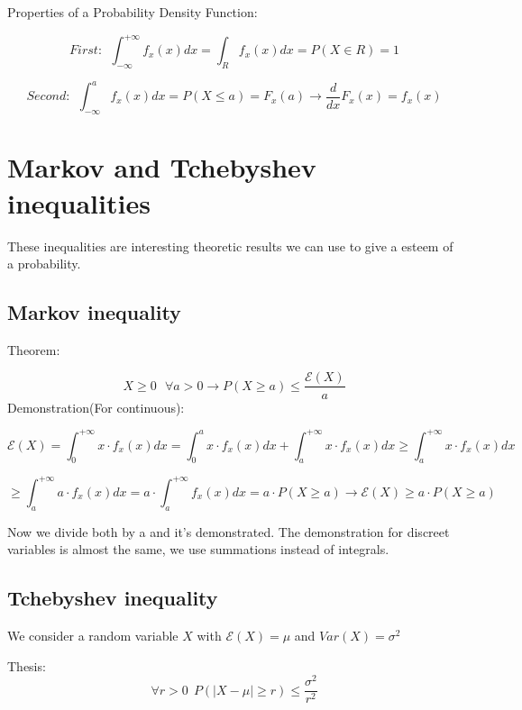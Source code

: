 \documentclass{article}
\begin{document}
\bigskip

\bigskip

\bigskip

\bigskip

\bigskip

Properties of a Probability Density Function:

$$First: \ \ \int_{- \infty}^{+ \infty} f_x(x)dx = \int_{R} f_x(x)dx = P(X \in R) = 1$$

$$Second: \ \ \int_{- \infty}^{a} f_x(x)dx = P(X \leq a) = F_x(a) \longrightarrow \frac{d}{dx} F_x(x) = f_x(x)$$

\section{Markov and Tchebyshev inequalities}

These inequalities are interesting theoretic results we can use to give a esteem of a probability.
\bigskip

\subsection{Markov inequality}

Theorem:
\bigskip

$$X \geq 0 \ \ \  \forall a > 0 \rightarrow P(X \geq a) \leq \frac{\mathcal E(X)}{a}$$
\bigskip
Demonstration(For continuous):

$$\mathcal E(X) = \int_{0}^{+ \infty} x \cdot f_x(x)dx = \int_{0}^ax\cdot f_x(x)dx + \int_{a}^{+ \infty} x \cdot f_x(x)dx \geq \int_{a}^{+ \infty} x \cdot f_x(x)dx$$

\bigskip 

$$\geq \int_{a}^{+ \infty} a \cdot f_x(x)dx = a \cdot \int_{a}^{+ \infty} f_x(x)dx = a \cdot P(X \geq a) \longrightarrow \mathcal E(X) \geq a \cdot P(X \geq a)$$

Now we divide both by a and it's demonstrated. The demonstration for discreet variables is almost the same, we use summations instead of integrals.

\subsection{Tchebyshev inequality}

We consider a random variable $X$ with $\mathcal E(X) = \mu$ and $Var(X) = \sigma^2$

Thesis:
$$\forall r > 0 \ \ P(|X - \mu| \geq r) \leq \frac{\sigma^2}{r^2}$$
\bigskip
\end{document}
